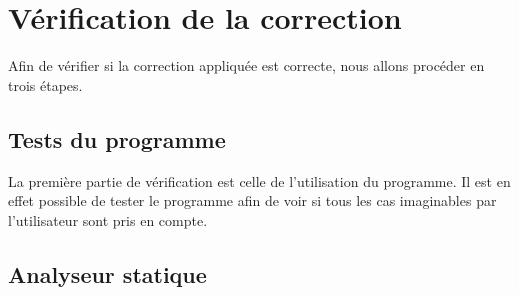 \section{Vérification de la correction}

Afin de vérifier si la correction appliquée est correcte, nous allons procéder en trois étapes.

\subsection{Tests du programme}

La première partie de vérification est celle de l'utilisation du programme. Il est en effet possible de tester le programme afin de voir si tous les cas imaginables par l'utilisateur sont pris en compte.

\subsection{Analyseur statique}

